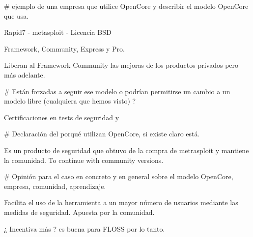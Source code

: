 # ejemplo de una empresa que utilice OpenCore y describir el modelo OpenCore que usa.

Rapid7 - metasploit - Licencia BSD

Framework, Community, Express y Pro.

Liberan al Framework Community las mejoras de los productos privados pero más adelante.

# Están forzadas a seguir ese modelo o podrían permitirse un cambio a un modelo libre (cualquiera que hemos visto) ?

Certificaciones en tests de seguridad y

# Declaración del porqué utilizan OpenCore, si existe claro está.

Es un producto de seguridad que obtuvo de la compra de metrasploit y mantiene la comunidad.
To continue with community versions.

# Opinión para el caso en concreto y en general sobre el modelo OpenCore, empresa, comunidad, aprendizaje.

Facilita el uso de la herramienta a un mayor número de usuarios mediante las medidas de seguridad.
Apuesta por la comunidad.

¿ Incentiva más ? es buena para FLOSS por lo tanto.

